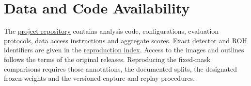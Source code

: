 \documentclass[journal]{IEEEtran}
\begin{document}
\section*{Data and Code Availability}
The \href{https://github.com/bingzhi495-creator/SAR-SEAL-research}{project repository} contains analysis code, configurations, evaluation protocols, data access instructions and aggregate scores. Exact detector and ROH identifiers are given in the \href{https://github.com/bingzhi495-creator/SAR-SEAL-research/blob/main/research_round_20260925_global/paper_boundary_refinement_20261120/design/NORA_REPRODUCIBILITY.md}{reproduction index}. Access to the images and outlines follows the terms of the original releases. Reproducing the fixed-mask comparisons requires those annotations, the documented splits, the designated frozen weights and the versioned capture and replay procedures.
\end{document}
